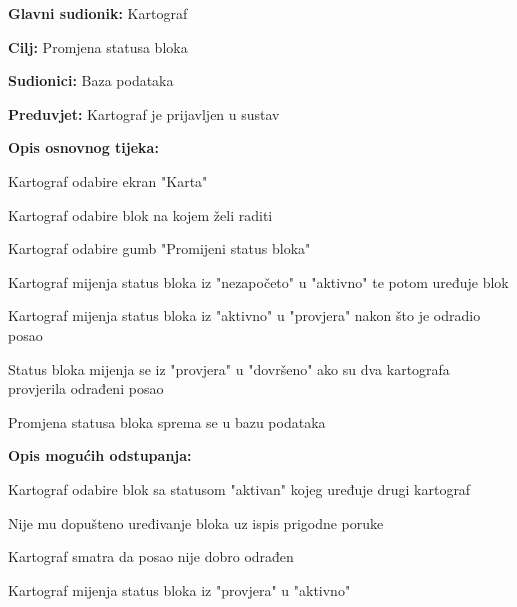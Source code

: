					\begin{packed_item}
						
						\item \textbf{Glavni sudionik: }Kartograf
						\item  \textbf{Cilj:} Promjena statusa bloka
						\item  \textbf{Sudionici:} Baza podataka
						\item  \textbf{Preduvjet:} Kartograf je prijavljen u sustav
						\item  \textbf{Opis osnovnog tijeka:}
						
						\item[] \begin{packed_enum}
							
							\item Kartograf odabire ekran "Karta"
							\item Kartograf odabire blok na kojem želi raditi
							\item Kartograf odabire gumb "Promijeni status bloka"
							\item Kartograf mijenja status bloka iz "nezapočeto" u "aktivno" te potom uređuje blok 
							\item Kartograf mijenja status bloka iz "aktivno" u "provjera" nakon što je odradio posao
							\item Status bloka mijenja se iz "provjera" u "dovršeno" ako su dva kartografa provjerila odrađeni posao
							\item Promjena statusa bloka sprema se u bazu podataka
						\end{packed_enum}
						
						\item  \textbf{Opis mogućih odstupanja:}
						
						\item[] \begin{packed_item}
							
							\item[2.a] Kartograf odabire blok sa statusom "aktivan" kojeg uređuje drugi kartograf
							\item[] \begin{packed_enum}
								
								\item Nije mu dopušteno uređivanje bloka uz ispis prigodne poruke
								
							\end{packed_enum}
							
							\item[5.a] Kartograf smatra da posao nije dobro odrađen
							\item[] \begin{packed_enum}
								
								\item Kartograf mijenja status bloka iz "provjera" u "aktivno"
								
							\end{packed_enum}
							
						\end{packed_item}
					\end{packed_item}
